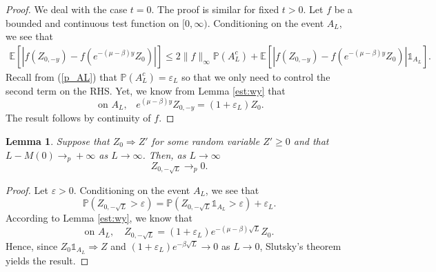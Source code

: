 \documentclass[11pt]{article}
\theoremstyle{plain}
\newtheorem{lemma}{Lemma}[section]
\newcommand\vep{\varepsilon}
\begin{document}
\begin{proof}
We deal with the case $t=0$. The proof is similar for fixed $t>0$. Let $f$ be a bounded and continuous test function on $[0,\infty)$. Conditioning on the event $A_L$, we see that  
\begin{eqnarray*}
\mathbb{E}\left[|f(Z_{0,{-y}})-f(e^{-(\mu-\beta)y}Z_0)|\right]\leqslant 2\|f\|_\infty\mathbb{P}(A_L^c)+ \mathbb{E}\left[\left|f(Z_{0,{-y}})-f(e^{-(\mu-\beta)y}Z_0)\right|\mathbb{1}_{A_L}\right].
\end{eqnarray*} 
Recall from (\ref{p_AL}) that $\mathbb{P}(A_L^c)=\vep_L$ so that we only need to control the second term on the RHS. Yet, we know from Lemma \ref{est:wy} that
\begin{equation*}
\text{ on $A_L$,} \quad e^{(\mu-\beta) y} Z_{0,-y}=(1+\vep_L)Z_0.
\end{equation*}
The result follows by continuity of $f$.
\end{proof}

\begin{lemma}\label{lem:ZsqrtL}
Suppose that $Z_0\Rightarrow Z'$ for some random variable $Z'\geqslant 0$ and that $L-M(0)\to_p+\infty$ as $L\to\infty$. Then, as $L\to \infty$
\begin{equation*}
Z_{0,-\sqrt{L}}\to_p0.
\end{equation*}
\end{lemma}
\begin{proof}
Let $\vep>0$. Conditioning on the event $A_L$, we see that
\begin{equation*}
\mathbb{P}\left(Z_{0,-\sqrt{L}}>\vep\right)= \mathbb{P}\left(Z_{0,-\sqrt{L}}\mathbb{1}_{A_L}>\vep\right)+\vep_L. 
\end{equation*}
According to Lemma \ref{est:wy}, we know that
\begin{equation*}
\text{on $A_L$}, \quad Z_{0,-\sqrt{L}}= (1+\vep_L)e^{-(\mu-\beta) \sqrt{L}} Z_0.
\end{equation*}
Hence, since $Z_0\mathbb{1}_{A_L}\Rightarrow Z$ and $(1+\vep_L)e^{-\beta \sqrt{L}}\to0$ as $L\to 0$, Slutsky's theorem yields the result.
\end{proof}
\end{document}

